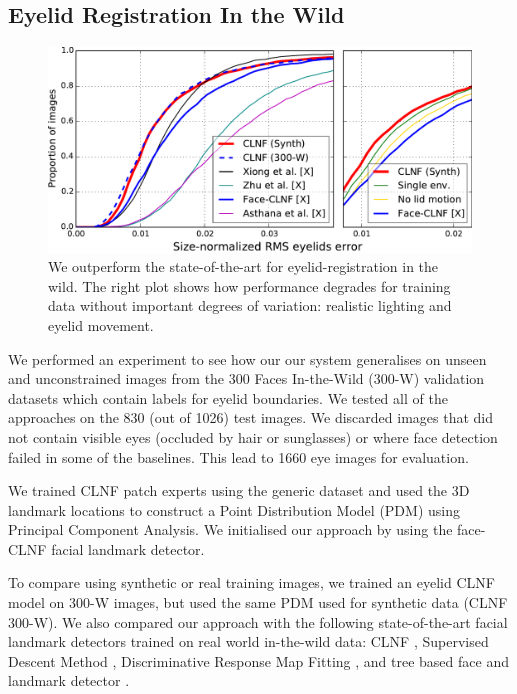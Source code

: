 \subsection{Eyelid Registration In the Wild}

\begin{figure}
    \centering
    \includegraphics[width=\columnwidth]{figs/CLNF_300W_experiment.pdf}
    \caption{We outperform the state-of-the-art for eyelid-registration in the wild. The right plot shows how performance degrades for training data without important degrees of variation: realistic lighting and eyelid movement.}
    \label{fig:clnf_results_wild}
\end{figure}

% 

We performed an experiment to see how our our system generalises on unseen and unconstrained images from the 300 Faces In-the-Wild (300-W) \cite{sagonas2013300} validation datasets which contain labels for eyelid boundaries. We tested all of the approaches on the 830 (out of 1026) test images. We discarded images that did not contain visible eyes (occluded by hair or sunglasses) or where face detection failed in some of the baselines. This lead to 1660 eye images for evaluation.

We trained CLNF patch experts using the generic \dataset dataset and used the 3D landmark locations to construct a Point Distribution Model (PDM) using Principal Component Analysis. 
We initialised our approach by using the face-CLNF \cite{baltrusaitis2013constrained} facial landmark detector.

To compare using synthetic or real training images, we trained an eyelid CLNF model on 300-W images, but used the same PDM used for synthetic data (CLNF 300-W).
We also compared our approach with the following state-of-the-art facial landmark detectors trained on real world in-the-wild data: CLNF \cite{baltrusaitis2013constrained}, Supervised Descent Method \cite{Xiong2013sdm}, Discriminative Response Map Fitting \cite{Asthana2013drmf}, and tree based face and landmark detector \cite{Zhu2012tree}. 

